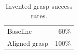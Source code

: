 \begin{table}
\caption{Invented grasp success rates.}
\label{tab:success}
\begin{tabular}{lr}
Baseline & 60\% \\
Aligned grasp & 100\% \\
\end{tabular}
\end{table}
